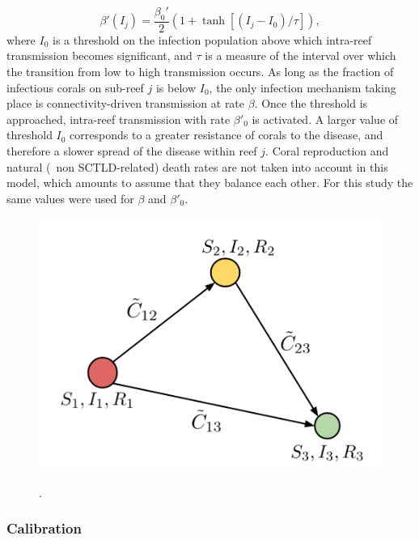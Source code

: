\begin{equation}
    \beta'(I_j) = \dfrac{\beta_0'}{2}(1+\tanh[(I_j-I_0)/\tau]),\label{eq:beta}
\end{equation}
where $I_0$ is a threshold on the infection population above which intra-reef transmission becomes significant, and $\tau$ is a measure of the interval over which the transition from low to high transmission occurs. As long as the fraction of infectious corals on sub-reef $j$ is below $I_0$, the only infection mechanism taking place is connectivity-driven transmission at rate $\beta$. Once the threshold is approached, intra-reef transmission with rate $\beta'_0$ is activated. A larger value of threshold $I_0$ corresponds to a greater resistance of corals to the disease, and therefore a slower spread of the disease within reef $j$. Coral reproduction and natural (\ie~non SCTLD-related) death rates are not taken into account in this model, which amounts to assume that they balance each other. For this study the same values were used for $\beta$ and $\beta'_0$.
\begin{figure}
	\centering
	\includegraphics[width=.6\textwidth]{chapters/sctld/figures/network_sir.png}
	\caption{}.
	\label{sctld:network_dir}
\end{figure}

\subsubsection{Calibration}

